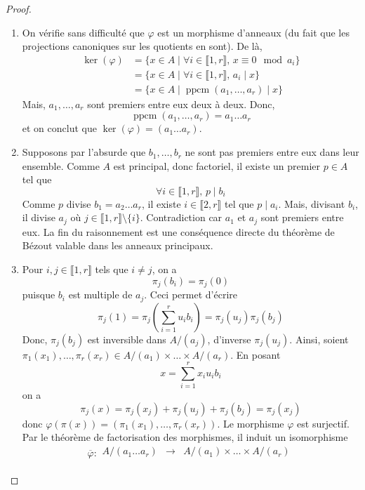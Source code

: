   \begin{proof}
    \begin{enumerate}[label=(\roman*)]
      \item On vérifie sans difficulté que $\varphi$ est un morphisme d'anneaux (du fait que les projections canoniques sur les quotients en sont). De là,
      \begin{align*}
        \ker(\varphi) &= \{ x \in A \mid \forall i \in \llbracket 1, r \rrbracket, \, x \equiv 0 \mod a_i \} \\
        &= \{ x \in A \mid \forall i \in \llbracket 1, r \rrbracket, \, a_i \mid x \} \\
        &= \{ x \in A \mid \operatorname{ppcm}(a_1, \dots, a_r) \mid x \}
      \end{align*}
      Mais, $a_1, \dots, a_r$ sont premiers entre eux deux à deux. Donc,
      \[ \operatorname{ppcm}(a_1, \dots, a_r) = a_1 \dots a_r \]
      et on conclut que $\ker(\varphi) = (a_1 \dots a_r)$.
      \item Supposons par l'absurde que $b_1, \dots, b_r$ ne sont pas premiers entre eux dans leur ensemble. Comme $A$ est principal, donc factoriel, il existe un premier $p \in A$ tel que
      \[ \forall i \in \llbracket 1, r \rrbracket, \, p \mid b_i \]
      Comme $p$ divise $b_1 = a_2 \dots a_r$, il existe $i \in \llbracket 2, r \rrbracket$ tel que $p \mid a_i$. Mais, divisant $b_i$, il divise $a_j$ où $j \in \llbracket 1, r \rrbracket \setminus \{ i \}$. Contradiction car $a_1$ et $a_j$ sont premiers entre eux. La fin du raisonnement est une conséquence directe du théorème de Bézout valable dans les anneaux principaux.
      \item Pour $i, j \in \llbracket 1, r \rrbracket$ tels que $i \neq j$, on a
      \[ \pi_j(b_i) = \pi_j(0) \]
      puisque $b_i$ est multiple de $a_j$. Ceci permet d'écrire
      \[ \pi_j(1) = \pi_j\left( \sum_{i=1}^{r} u_i b_i \right) = \pi_j(u_j) \pi_j(b_j) \]
      Donc, $\pi_j(b_j)$ est inversible dans $A/(a_j)$, d'inverse $\pi_j(u_j)$. Ainsi, soient $\pi_1(x_1), \dots, \pi_r(x_r) \in A/(a_1) \times \dots \times A/(a_r)$. En posant
      \[ x = \sum_{i=1}^r x_i u_i b_i \]
      on a
      \[ \pi_j(x) = \pi_j(x_j) + \pi_j(u_j) + \pi_j(b_j) = \pi_j(x_j) \]
      donc $\varphi(\pi(x)) = (\pi_1(x_1), \dots, \pi_r(x_r))$. Le morphisme $\varphi$ est surjectif. Par le théorème de factorisation des morphismes, il induit un isomorphisme
      \[
        \overline{\varphi} :
        \begin{array}{ccc}
          A/(a_1 \dots a_r) &\rightarrow& A/(a_1) \times \dots \times A/(a_r) \\

\end{array}\]
\end{enumerate}
\end{proof}
